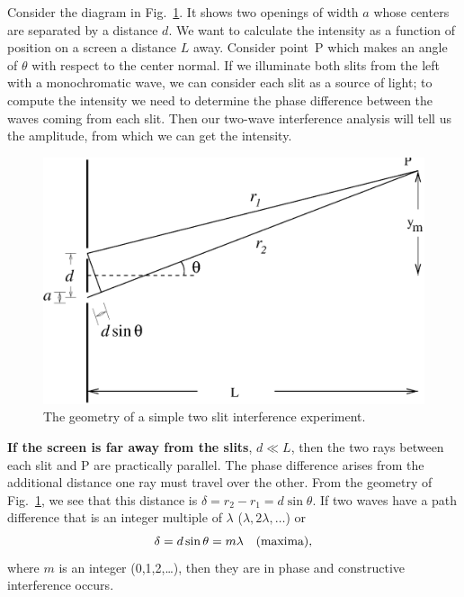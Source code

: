Consider the diagram in Fig.~\ref{fig:diff:2-slit}. 
It shows two openings of 
width $a$ whose centers are separated by a distance $d$. We want to calculate 
the intensity as a function of position on a screen a distance $L$ away. 
Consider point~P which makes an angle of $\theta$ with respect to the center 
normal. If we illuminate both slits from the left with a monochromatic wave, 
we can consider each slit as a source of light; to compute the intensity we 
need to determine the phase difference between the waves coming from each slit.
Then our two-wave interference analysis will tell us the amplitude, from which 
we can get the intensity.
\begin{figure}[htb]
\centering 
\epsfxsize=8cm \includegraphics[scale=0.6]{10_diffraction/twoslit.eps}
\caption{The geometry of a simple two slit interference experiment.}
\label{fig:diff:2-slit}
\end{figure}

{\bf If the screen is far away from the slits}, $d \ll L$, then the two rays
between each slit and P are practically parallel. The phase difference arises
from the additional distance one ray must travel over the other. From the 
geometry of Fig.~\ref{fig:diff:2-slit}, we see that this distance is
$ \delta = r_2 - r_1 = d \sin \theta.$  If two waves have a path difference
that is an integer multiple of $\lambda$ ($\lambda, 2\lambda, \dots$) or
\begin{eqnarray}
\delta = d \sin \theta = m \lambda~~~{\rm (maxima)},
\label{eq:diff:2 slit maxima}
\end{eqnarray}
where $m$ is an integer (0,1,2,\dots), then they 
are in phase and constructive interference occurs.

